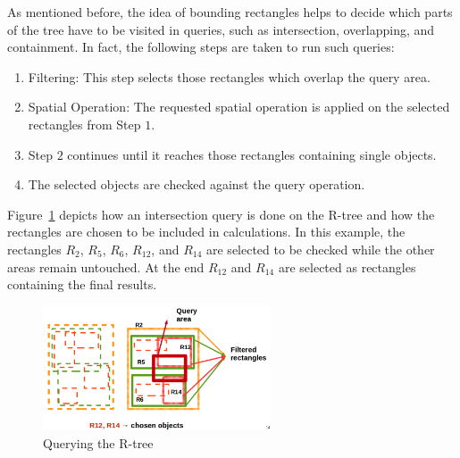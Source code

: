 \documentclass[a4paper,12pt]{article}
\begin{document}
As mentioned before, the idea of bounding rectangles helps to decide which parts of the tree have to be visited in queries, such as intersection, overlapping, and containment. In fact, the following steps are taken to run such queries:
\begin{enumerate}
\item Filtering: This step selects those rectangles which overlap the query area.
\item Spatial Operation: The requested spatial operation is applied on the selected rectangles from Step $1$. 
\item Step $2$ continues until it reaches those rectangles containing single objects. 
\item The selected objects are checked against the query operation. 
\end{enumerate}
Figure~\ref{rtreequery} depicts how an intersection query is done on the R-tree and how the rectangles are chosen to be included in calculations. In this example, the rectangles $R_2$, $R_5$, $R_6$, $R_{12}$, and $R_{14}$ are selected to be checked while the other areas remain untouched. At the end $R_{12}$ and $R_{14}$ are selected as rectangles containing the final results.

\begin{figure}
\centering
\includegraphics[width=0.6\textwidth,height=0.2\textheight]{Rtree-query}
\caption{Querying the R-tree}
\label{rtreequery}
\end{figure}
\end{document}
